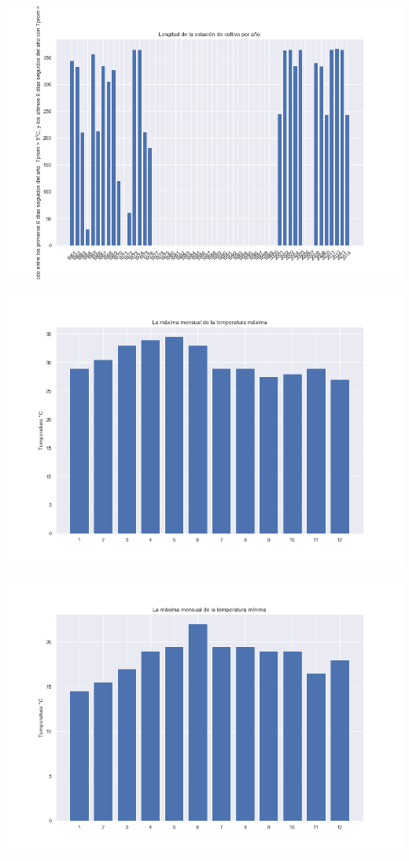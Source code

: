 \documentclass[12pt]{article}
\begin{document}
\begin{center}
\includegraphics[scale=0.5]{GSL.png}
\end{center} 
\begin{center}
\includegraphics[scale=0.5]{TXx.png}
\end{center} 
\begin{center}
\includegraphics[scale=0.5]{TNx.png}
\end{center} 
\end{document}
